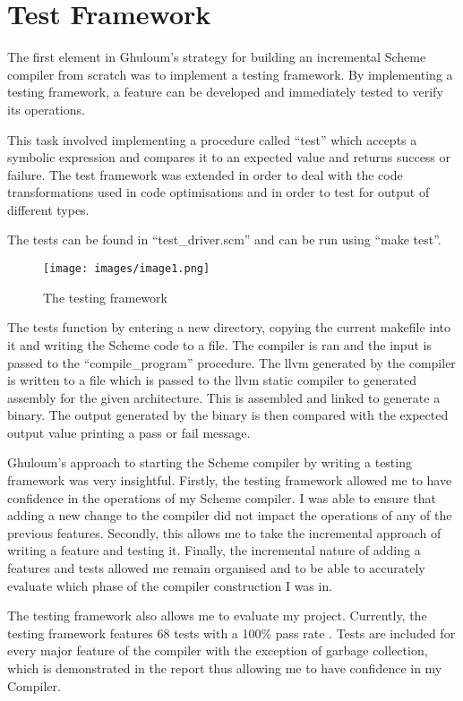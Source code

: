 \documentclass{article}
\begin{document}
\section{Test Framework}

The first element in Ghuloum's strategy for building an incremental Scheme compiler from scratch was to implement a testing framework. By implementing a testing framework, a feature can be developed and immediately tested to verify its operations. 

This task involved implementing a procedure called ``test'' which accepts a symbolic expression and compares it to an expected value and returns success or failure. The test framework was extended in order to deal with the code transformations used in code optimisations and in order to test for output of different types.

The tests can be found in ``test\_driver.scm'' and can be run using ``make test''.

\begin{figure}[!htb]
  \caption{The testing framework}
  \centering
  \texttt{[image: images/image1.png]}
\end{figure}

The tests function by entering a new directory, copying the current makefile into it and writing the Scheme code to a file. The compiler is ran and the input is passed to the ``compile\_program'' procedure. The llvm generated by the compiler is written to a file which is passed to the llvm static compiler to generated assembly for the given architecture. This is assembled and linked to generate a binary.  The output generated by the binary is then compared with the expected output value printing a pass or fail message.

Ghuloum's approach to starting the Scheme compiler by writing a testing framework was very insightful. Firstly, the testing framework allowed me to have confidence in the operations of my Scheme compiler. I was able to ensure that adding a new change to the compiler did not impact the operations of any of the previous features. Secondly, this allows me to take the incremental approach of writing a feature and testing it. Finally, the incremental nature of adding a features and tests allowed me remain organised and to be able to accurately evaluate which phase of the compiler construction I was in.

The testing framework also allows me to evaluate my project. Currently, the testing framework features 68 tests with a 100\% pass rate . Tests are included for every major feature of the compiler with the exception of garbage collection, which is demonstrated in the report thus allowing me to have confidence in my Compiler.
\end{document}
